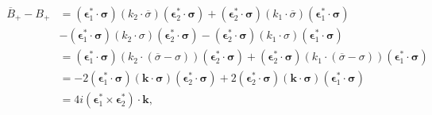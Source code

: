 \begin{align}
  \begin{split}
    \overline{B}_+ - B_+ &= (\boldsymbol{\epsilon}_1^\ast \cdot \boldsymbol\sigma)(k_2 \cdot \overline\sigma)(\boldsymbol{\epsilon}_2^\ast \cdot \boldsymbol\sigma)
    + (\boldsymbol{\epsilon}_2^\ast \cdot \boldsymbol\sigma)(k_1 \cdot \overline\sigma)(\boldsymbol{\epsilon}_1^\ast \cdot \boldsymbol\sigma) \\
    &- (\boldsymbol{\epsilon}_1^\ast \cdot \boldsymbol\sigma)(k_2 \cdot \sigma)(\boldsymbol{\epsilon}_2^\ast \cdot \boldsymbol\sigma)
    - (\boldsymbol{\epsilon}_2^\ast \cdot \boldsymbol\sigma)(k_1 \cdot \sigma)(\boldsymbol{\epsilon}_1^\ast \cdot \boldsymbol\sigma) \\
    &= (\boldsymbol{\epsilon}_1^\ast \cdot \boldsymbol\sigma)(k_2 \cdot (\overline\sigma - \sigma))(\boldsymbol{\epsilon}_2^\ast \cdot \boldsymbol\sigma)
    + (\boldsymbol{\epsilon}_2^\ast \cdot \boldsymbol\sigma)(k_1 \cdot (\overline\sigma - \sigma))(\boldsymbol{\epsilon}_1^\ast \cdot \boldsymbol\sigma) \\
    &= -2(\boldsymbol{\epsilon}_1^\ast \cdot \boldsymbol\sigma)(\boldsymbol{k}\cdot\boldsymbol\sigma)(\boldsymbol{\epsilon}_2^\ast \cdot \boldsymbol\sigma)
    + 2(\boldsymbol{\epsilon}_2^\ast \cdot \boldsymbol\sigma)(\boldsymbol{k}\cdot\boldsymbol\sigma)(\boldsymbol{\epsilon}_1^\ast \cdot \boldsymbol\sigma) \\
    &= 4i (\boldsymbol{\epsilon}_1^\ast \times \boldsymbol{\epsilon}_2^\ast) \cdot \boldsymbol{k} , \\
  \end{split}
  \label{prob5_4a_BBB}
\end{align}

